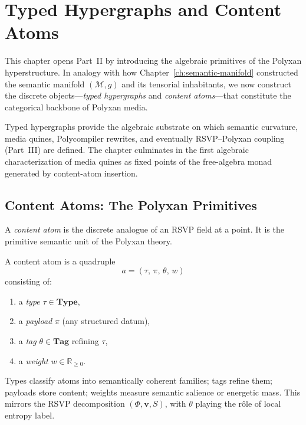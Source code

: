 \chapter{Typed Hypergraphs and Content Atoms}
\label{ch:typed-hypergraphs}

This chapter opens Part~II by introducing the algebraic primitives of the
Polyxan hyperstructure.  In analogy with how Chapter~\ref{ch:semantic-manifold}
constructed the semantic manifold $(\mathcal{M},g)$ and its tensorial
inhabitants, we now construct the discrete objects—\emph{typed hypergraphs} and
\emph{content atoms}—that constitute the categorical backbone of Polyxan media.

Typed hypergraphs provide the algebraic substrate on which semantic curvature,
media quines, Polycompiler rewrites, and eventually RSVP--Polyxan coupling
(Part~III) are defined.  The chapter culminates in the first algebraic
characterization of media quines as fixed points of the free-algebra monad
generated by content-atom insertion.

\section{Content Atoms: The Polyxan Primitives}

A \emph{content atom} is the discrete analogue of an RSVP field at a point.
It is the primitive semantic unit of the Polyxan theory.

\begin{definition}
A content atom is a quadruple
\[
a = (\tau,\, \pi,\, \theta,\, w)
\]
consisting of:
\begin{enumerate}
\item a \emph{type} $\tau \in \mathbf{Type}$,
\item a \emph{payload} $\pi$ (any structured datum),
\item a \emph{tag} $\theta \in \mathbf{Tag}$ refining $\tau$,
\item a \emph{weight} $w \in \mathbb{R}_{\ge 0}$.
\end{enumerate}
\]
\end{definition}

Types classify atoms into semantically coherent families; tags refine them;
payloads store content; weights measure semantic salience or energetic mass.
This mirrors the RSVP decomposition $(\Phi,\mathbf{v},S)$, with $\theta$
playing the rôle of local entropy label.

